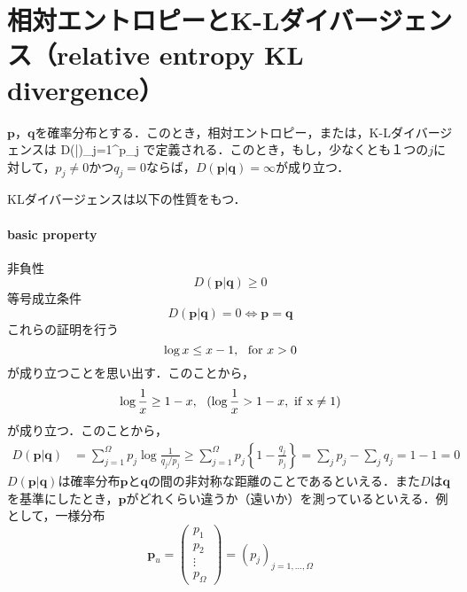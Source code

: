 \section{相対エントロピーとK-Lダイバージェンス（relative entropy KL divergence）}
\begin{kotak}
	\begin{definition}
	$\bm{p}$，$\bm{q}$を確率分布とする．このとき，相対エントロピー，または，K-Lダイバージェンスは
	\be
	D(|)\equiv\sum_{j=1}^{\Omega}p_j
	\ee
	で定義される．このとき，もし，少なくとも１つの$j$に対して，$p_j\neq0$かつ$q_j=0$ならば，$D(\bm{p}|\bm{q})=\infty$が成り立つ．
	\end{definition}
\end{kotak}
KLダイバージェンスは以下の性質をもつ．
\paragraph{basic property}
非負性
\begin{equation}
    D(\bm{p}|\bm{q})\geq0
\end{equation}
等号成立条件
\begin{equation}
    D(\bm{p}|\bm{q})=0\iff \bm{p}=\bm{q}
\end{equation}
これらの証明を行う
\begin{equation}
    \log{x}\leq x-1,\ \ {\rm{for}}\ x>0
\end{equation}
が成り立つことを思い出す．このことから，
\begin{equation}
    \log{\frac{1}{x}}\geq1-x,\ \ ( \log{\frac{1}{x}}>1-x,\ \rm{if}\ x\neq1)
\end{equation}
が成り立つ．このことから，
\begin{align}
    D(\bm{p}|\bm{q})&=\sum_{j=1}^{\Omega}p_j\log{\frac{1}{q_j/p_j}}\geq \sum_{j=1}^{\Omega}p_j\left\{1-\frac{q_j}{p_j}\right\}=\sum_jp_j-\sum_jq_j=1-1=0
\end{align}
$D(\bm{p}|\bm{q})$は確率分布$\bm{p}$と$\bm{q}$の間の非対称な距離のことであるといえる．また$D$は$\bm{q}$を基準にしたとき，$\bm{p}$がどれくらい違うか（遠いか）を測っているといえる．例として，一様分布
\begin{equation}
    \bm{p}_u= \left(
        \begin{array}{c}
        p_1 \\
        p_2 \\
        \vdots \\
        p_\Omega
        \end{array}
        \right)
        =(p_j)_{j=1,\ldots,\Omega}
\end{equation}

